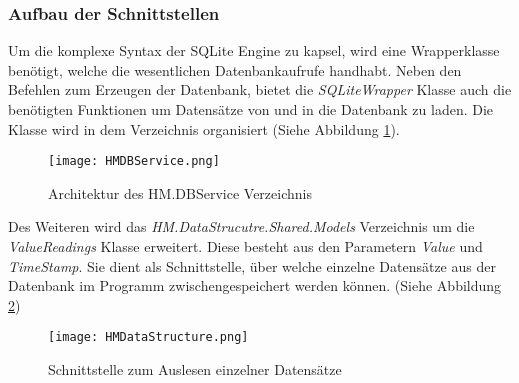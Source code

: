 \subsubsection*{Aufbau der Schnittstellen}
Um die komplexe Syntax der SQLite Engine zu kapsel, wird eine Wrapperklasse benötigt, welche die wesentlichen Datenbankaufrufe handhabt. Neben den Befehlen zum Erzeugen der Datenbank, bietet die \textit{SQLiteWrapper} Klasse auch die benötigten Funktionen um Datensätze von und in die Datenbank zu laden. Die Klasse wird in dem Verzeichnis organisiert (Siehe Abbildung \ref{fig:HMDBServi}).
\begin{center}
    \begin{figure}[h!]
        \centering
        \texttt{[image: HMDBService.png]}
        \caption{Architektur des HM.DBService Verzeichnis}
        \label{fig:HMDBServi}
    \end{figure}
\end{center}
\vspace{-1.8cm}
Des Weiteren wird das \textit{HM.DataStrucutre.Shared.Models} Verzeichnis um die \textit{ValueReadings} Klasse erweitert. Diese besteht aus den Parametern \textit{Value} und \textit{TimeStamp}. Sie dient als Schnittstelle, über welche einzelne Datensätze aus der Datenbank im Programm zwischengespeichert werden können. (Siehe Abbildung \ref{fig:ValueReadingsKlasse})
\begin{center}
    \begin{figure}[h!]
        \centering
        \texttt{[image: HMDataStructure.png]}
        \caption{Schnittstelle zum Auslesen einzelner Datensätze}
        \label{fig:ValueReadingsKlasse}
    \end{figure}
\end{center}





















